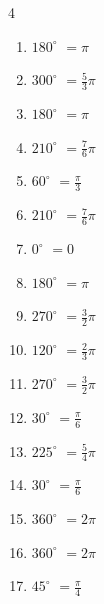 \begin{multicols}{4}
\begin{enumerate}
  \item $\displaystyle 180^{\circ}$
        $\displaystyle =\pi$

  \item $\displaystyle 300^{\circ}$
        $\displaystyle =\frac{5}{3}\pi$

  \item $\displaystyle 180^{\circ}$
        $\displaystyle =\pi$

  \item $\displaystyle 210^{\circ}$
        $\displaystyle =\frac{7}{6}\pi$

  \item $\displaystyle 60^{\circ}$
        $\displaystyle =\frac{\pi}{3}$

  \item $\displaystyle 210^{\circ}$
        $\displaystyle =\frac{7}{6}\pi$

  \item $\displaystyle 0^{\circ}$
        $\displaystyle =0$

  \item $\displaystyle 180^{\circ}$
        $\displaystyle =\pi$

  \item $\displaystyle 270^{\circ}$
        $\displaystyle =\frac{3}{2}\pi$

  \item $\displaystyle 120^{\circ}$
        $\displaystyle =\frac{2}{3}\pi$

  \item $\displaystyle 270^{\circ}$
        $\displaystyle =\frac{3}{2}\pi$

  \item $\displaystyle 30^{\circ}$
        $\displaystyle =\frac{\pi}{6}$

  \item $\displaystyle 225^{\circ}$
        $\displaystyle =\frac{5}{4}\pi$

\columnbreak %

  \item $\displaystyle 30^{\circ}$
        $\displaystyle =\frac{\pi}{6}$

  \item $\displaystyle 360^{\circ}$
        $\displaystyle =2\pi$

  \item $\displaystyle 360^{\circ}$
        $\displaystyle =2\pi$

  \item $\displaystyle 45^{\circ}$
        $\displaystyle =\frac{\pi}{4}$


\end{enumerate}
\end{multicols}
